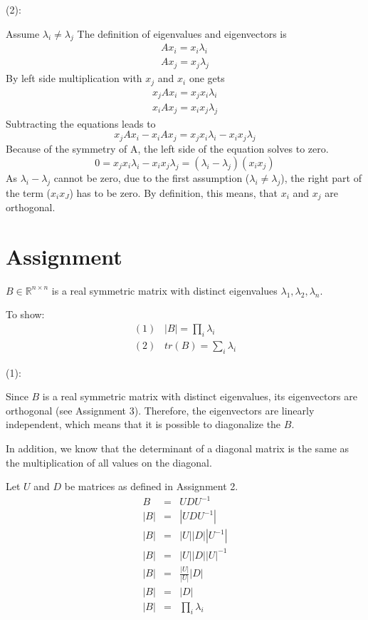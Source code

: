 \documentclass{article}
\begin{document}
 
(2):

 Assume
$\lambda_i \neq \lambda_j$
The definition of eigenvalues and eigenvectors is
\begin{eqnarray}
Ax_i = x_i\lambda_i \\
Ax_j = x_j\lambda_j
\end{eqnarray}
By left side multiplication with $x_j$ and $x_i$ one gets
\begin{eqnarray}
x_jAx_i = x_jx_i\lambda_i \\
x_iAx_j = x_ix_j\lambda_j
\end{eqnarray}
 Subtracting the equations leads to
 \begin{equation}
 x_jAx_i - x_iAx_j = x_jx_i\lambda_i - x_ix_j\lambda_j
\end{equation}  
Because of the symmetry of A, the left side of the equation solves to zero.
\begin{equation}
 0 = x_jx_i\lambda_i - x_ix_j\lambda_j = (\lambda_i-\lambda_j)(x_ix_j)
\end{equation}
As $\lambda_i-\lambda_j$ cannot be zero, due to the first assumption ($\lambda_i \neq \lambda_j$), the right part of the term ($x_ix_J$) has to be zero. By definition, this means, that $x_i$ and $x_j$ are orthogonal.





\section{Assignment}		%
$B \in \mathbb{R}^{n \times n}$ is a real symmetric matrix with distinct eigenvalues $\lambda_1, \lambda_2, \lambda_n$.

To show:
\begin{eqnarray}
(1)\;\;\; |B|=\prod_i \lambda_i\\
(2) \;\;\; tr(B) = \sum_i \lambda_i
\end{eqnarray}

(1):

Since $B$ is a real symmetric matrix with distinct eigenvalues, its eigenvectors are orthogonal (see Assignment 3). Therefore, the eigenvectors are linearly independent, which means that it is possible to diagonalize the $B$.

In addition, we know that the determinant of a diagonal matrix is the same as the multiplication of all values on the diagonal.

Let $U$ and $D$ be matrices as defined in Assignment 2.
\begin{eqnarray}
B &=& UDU^{-1}\\
|B| &=& |UDU^{-1}|\\
|B| &=& |U||D||U^{-1}|\\
|B| &=& |U||D||U|^{-1}\\
|B| &=& \frac{|U|}{|U|}|D|\\
|B| &=& |D|\\
|B| &=& \prod_i \lambda_i
\end{eqnarray}
\end{document}
